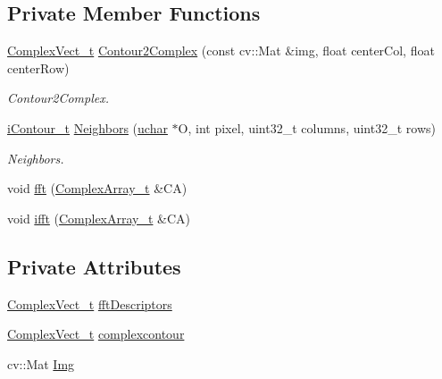 \subsection*{Private Member Functions}
\begin{DoxyCompactItemize}
\item 
\hyperlink{_soil_math_types_8h_a7567e521c2b2c408dcb62dbff72390f7}{Complex\+Vect\+\_\+t} \hyperlink{class_soil_math_1_1_f_f_t_a18a95490ea8e929584c2af6569dec3b6}{Contour2\+Complex} (const cv\+::\+Mat \&img, float center\+Col, float center\+Row)
\begin{DoxyCompactList}\small\item\em Contour2\+Complex. \end{DoxyCompactList}\item 
\hyperlink{_soil_math_types_8h_a1ade796add2f13888dfa9e6bde0bdc37}{i\+Contour\+\_\+t} \hyperlink{class_soil_math_1_1_f_f_t_a45b32ad009154112d2fc4e467fc7c5ac}{Neighbors} (\hyperlink{_soil_math_types_8h_a65f85814a8290f9797005d3b28e7e5fc}{uchar} $\ast$O, int pixel, uint32\+\_\+t columns, uint32\+\_\+t rows)
\begin{DoxyCompactList}\small\item\em Neighbors. \end{DoxyCompactList}\item 
void \hyperlink{class_soil_math_1_1_f_f_t_a48bc7ad948d820d6f87b3e353b6d1cd4}{fft} (\hyperlink{_soil_math_types_8h_a5118c9f6b02a06945c93a3893e51febe}{Complex\+Array\+\_\+t} \&C\+A)
\item 
void \hyperlink{class_soil_math_1_1_f_f_t_a5b7f18d1cb2d728584414d8660d52586}{ifft} (\hyperlink{_soil_math_types_8h_a5118c9f6b02a06945c93a3893e51febe}{Complex\+Array\+\_\+t} \&C\+A)
\end{DoxyCompactItemize}
\subsection*{Private Attributes}
\begin{DoxyCompactItemize}
\item 
\hyperlink{_soil_math_types_8h_a7567e521c2b2c408dcb62dbff72390f7}{Complex\+Vect\+\_\+t} \hyperlink{class_soil_math_1_1_f_f_t_a466b360529319d0e6e3220f446f703be}{fft\+Descriptors}
\item 
\hyperlink{_soil_math_types_8h_a7567e521c2b2c408dcb62dbff72390f7}{Complex\+Vect\+\_\+t} \hyperlink{class_soil_math_1_1_f_f_t_a48141f0c777ca86f2e536f88b509b639}{complexcontour}
\item 
cv\+::\+Mat \hyperlink{class_soil_math_1_1_f_f_t_a2efda8f90cd255a2c18352636352044f}{Img}
\end{DoxyCompactItemize}


